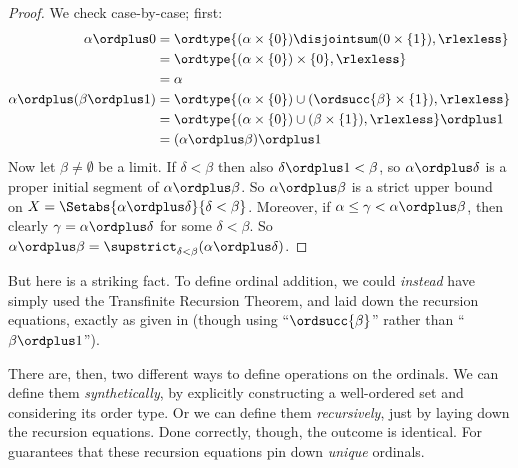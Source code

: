 \documentclass[../../../include/open-logic-section]{subfiles}
\begin{document}
\begin{proof}
	We check case-by-case; first:
		\begin{align*}
			\alpha \ordplus  0 &= \ordtype{(\alpha \times \{0\}) \disjointsum (0 \times \{1\}), \rlexless} \\
			&= \ordtype{(\alpha \times \{0\})\times\{0\}, \rlexless}\\
			&= \alpha\\
	\alpha \ordplus  (\beta \ordplus  1) %
			&= \ordtype{(\alpha\times \{0\}) \cup (\ordsucc{\beta}\times \{1\}), \rlexless} \\
			&= \ordtype{(\alpha\times \{0\}) \cup (\beta \times \{1\}), \rlexless} \ordplus  1 \\
			&= (\alpha \ordplus  \beta) \ordplus  1
\end{align*}
Now let $\beta \neq \emptyset$ be a limit. If $\delta < \beta$ then also $\delta\ordplus 1 < \beta$, so $\alpha \ordplus  \delta$ is a proper initial segment of $\alpha \ordplus  \beta$. So $\alpha \ordplus  \beta$ is a strict upper bound on $X = \Setabs{\alpha \ordplus  \delta}{\delta < \beta}$. Moreover, if $\alpha \leq \gamma < \alpha \ordplus  \beta$, then clearly $\gamma = \alpha \ordplus  \delta$ for some $\delta < \beta$. So $\alpha \ordplus  \beta = \supstrict_{\delta< \beta}(\alpha\ordplus \delta)$. 
\end{proof}\noindent
But here is a striking fact. To define ordinal addition, we could \emph{instead} have simply used the Transfinite Recursion Theorem, and laid down the recursion equations, exactly as given in  (though using ``$\ordsucc{\beta}$'' rather than ``$\beta \ordplus 1$'').

There are, then, two different ways to define operations on the ordinals. We can define them \emph{synthetically}, by explicitly constructing a well-ordered set and considering its order type. Or we can define them \emph{recursively}, just by laying down the recursion equations. Done correctly, though, the outcome is identical. For   guarantees that these recursion equations pin down \emph{unique} ordinals.
\end{document}
